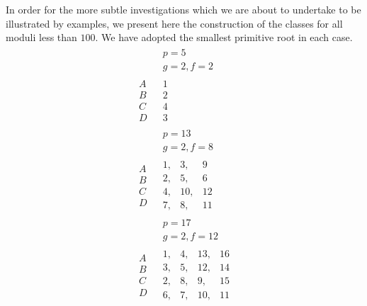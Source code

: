 \documentclass[twoside,12pt]{memoir}
\begin{document}
In order for the more subtle investigations which we are about to undertake to be illustrated by examples, we present here the construction of the classes for all moduli less than \(100\). We have adopted the smallest primitive root in each case.
\[\begin{aligned}
& \begin{array}{c} p=5 \\  g=2, f=2 \end{array} \\
\begin{array}{l} A \\ B \\ C \\D \end{array} & \begin{array}{|r} 1 \\ 2 \\ 4 \\ 3 \end{array} \\
& \begin{array}{c} p=13 \\  g=2, f=8 \end{array} \\ 
\begin{array}{l} A \\ B \\ C \\D \end{array} & \begin{array}{|rrr} 1,& 3,& 9 \\ 2,& 5,&6 \\ 4,& 10,& 12 \\ 7,& 8,& 11 \end{array}\\
& \begin{array}{c} p=17 \\  g=2, f=12 \end{array} \\
\begin{array}{l} A \\ B \\ C \\D \end{array} & 
\begin{array}{|rrrr} 
1,& 4,&13,& 16 \\ 
3,& 5,&12,&14 \\
2,& 8,& 9,&15 \\ 
6,& 7,&10,&11 
\end{array} \\

\end{aligned}\]
\end{document}
